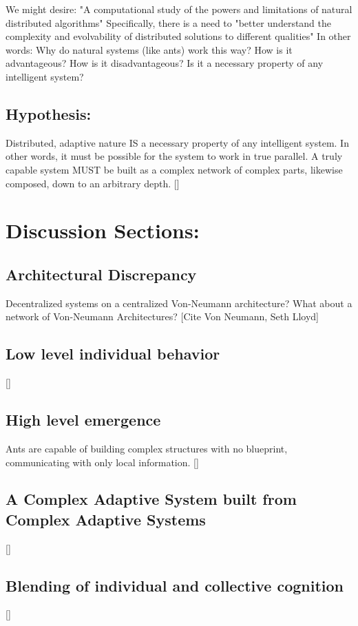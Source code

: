 \documentclass{nature}
\begin{document}
We might desire: "A computational study of the powers and limitations of natural distributed algorithms" Specifically, there is a need to "better understand the complexity and evolvability of distributed solutions to different qualities"
In other words: Why do natural systems (like ants) work this way?
How is it advantageous?
How is it disadvantageous?
Is it a necessary property of any intelligent system?

\subsection{Hypothesis:}
Distributed, adaptive nature IS a necessary property of any intelligent system.
In other words, it must be possible for the system to work in true parallel.
A truly capable system MUST be built as a complex network of complex parts, likewise composed, down to an arbitrary depth.
[]

\section{Discussion Sections:}
\subsection{Architectural Discrepancy}
    Decentralized systems on a centralized Von-Neumann architecture? What about a network of Von-Neumann Architectures?
    [Cite Von Neumann, Seth Lloyd]
\subsection{Low level individual behavior}
    []
\subsection{High level emergence}
    Ants are capable of building complex structures with no blueprint, communicating with only local information.
    []
\subsection{A Complex Adaptive System built from Complex Adaptive Systems}
    []
\subsection{Blending of individual and collective cognition}
    []
\end{document}
